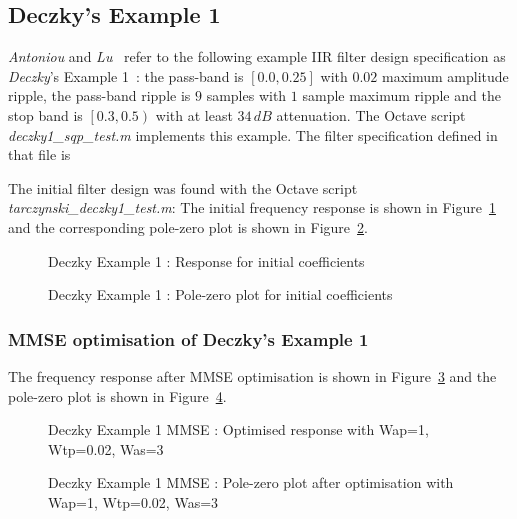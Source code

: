 \documentclass[a4paper,twoside,10pt,english]{report}
\begin{document}
\subsection{\label{sub:Deczkys-Example-1}Deczky's Example 1}
\emph{Antoniou} and 
\emph{Lu}~\cite[Example 16.3]{AntoniouLu_PracticalOptimization}
refer to the following example IIR filter design specification as
\emph{Deczky}'s Example 1~\cite{Deczky_MinPSynthesisIIRDigitalFilters}: the
pass-band is $\left[0.0,0.25\right]$ with $0.02$ maximum amplitude ripple,
the pass-band ripple is $9$ samples with $1$ sample maximum ripple and
the stop band is $\left[0.3,0.5\right)$ with at least $34\,dB$ attenuation.
The Octave script \emph{deczky1\_sqp\_test.m} implements this example. The
filter specification defined in that file is
\begin{small}

\end{small}
The initial filter design was found with the Octave script 
\emph{tarczynski\_deczky1\_test.m}:
The initial frequency response is shown in
Figure~\ref{fig:Deczky-Ex1-Initial-x0} and the corresponding pole-zero plot is 
shown in Figure~\ref{fig:Deczky-Ex1-Initial-x0-pz}.
\begin{figure}[!htbp]
\begin{center}
\scalebox{0.7}{}
\caption{Deczky Example 1 : Response for initial coefficients}
\label{fig:Deczky-Ex1-Initial-x0}
\end{center}
\end{figure}
\begin{figure}[!htbp]
\begin{center}
\scalebox{0.7}{}
\caption{Deczky Example 1 : Pole-zero plot for initial coefficients}
\label{fig:Deczky-Ex1-Initial-x0-pz}
\end{center}
\end{figure}
\subsubsection{MMSE optimisation of Deczky's Example 1}
The frequency response after MMSE optimisation is shown in
Figure~\ref{fig:Deczky-Ex1-MMSE-x1} and the pole-zero plot is shown in 
Figure~\ref{fig:Deczky-Ex1-MMSE-x1-pz}.
\begin{figure}[!htbp]
\begin{center}
\scalebox{0.7}{}
\caption{Deczky Example 1 MMSE : Optimised response with Wap=1, Wtp=0.02, Was=3}
\label{fig:Deczky-Ex1-MMSE-x1}
\end{center}
\end{figure}
\begin{figure}[!htbp]
\begin{center}
\scalebox{0.7}{}
\caption{Deczky Example 1 MMSE : Pole-zero plot after optimisation with Wap=1, Wtp=0.02, Was=3}
\label{fig:Deczky-Ex1-MMSE-x1-pz}
\end{center}
\end{figure}
\end{document}
